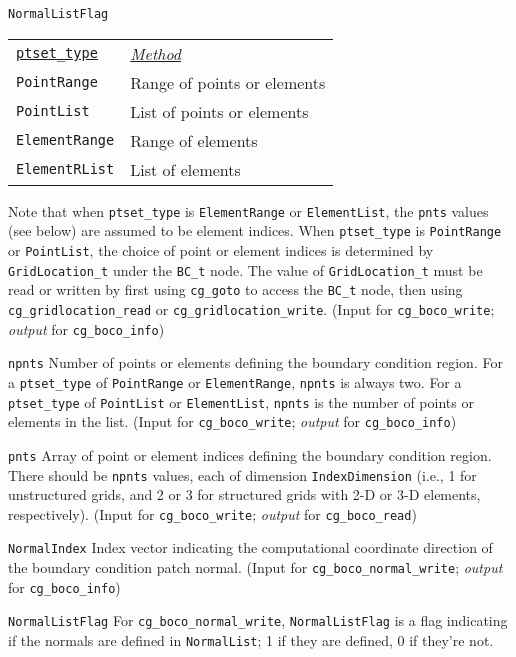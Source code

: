\begin{Ventryi}{\texttt{NormalListFlag}}
      \setlength{\tmplength}{\extrarowheight}	%
      \setlength{\extrarowheight}{0pt}
      \begin{tabular}{@{}l >{\ttfamily}l}
         \uline{\texttt{ptset\_type}} & \uline{\textit{Method}} \\
         \texttt{PointRange}   & Range of points or elements \\
         \texttt{PointList}    & List of points or elements \\
         \texttt{ElementRange} & Range of elements \\
         \texttt{ElementRList} & List of elements
      \end{tabular}
      \setlength{\extrarowheight}{\tmplength}

      Note that when \texttt{ptset\_type} is \texttt{ElementRange} or
      \texttt{ElementList}, the \texttt{pnts} values (see below) are assumed
      to be element indices.
      When \texttt{ptset\_type} is \texttt{PointRange} or \texttt{PointList},
      the choice of point or element indices is determined by
      \texttt{GridLocation\_t} under the \texttt{BC\_t} node.
      The value of \texttt{GridLocation\_t} must be read or
      written by first using \texttt{cg\_goto} to access the
      \texttt{BC\_t} node, then using \texttt{cg\_gridlocation\_read} or
      \texttt{cg\_gridlocation\_write}.
      (\textcolor{input}{Input} for \texttt{cg\_boco\_write};
      \textcolor{output}{\textit{output}} for \texttt{cg\_boco\_info})
\item [\texttt{npnts}]
      Number of points or elements defining the boundary
      condition region.
      For a \texttt{ptset\_type} of \texttt{PointRange} or \texttt{ElementRange},
      \texttt{npnts} is always two.
      For a \texttt{ptset\_type} of \texttt{PointList} or \texttt{ElementList},
      \texttt{npnts} is the number of points or elements in the list.
      (\textcolor{input}{Input} for \texttt{cg\_boco\_write};
      \textcolor{output}{\textit{output}} for \texttt{cg\_boco\_info})
\item [\texttt{pnts}]
      Array of point or element indices defining the boundary condition
      region.
      There should be \texttt{npnts} values, each of dimension
      \texttt{IndexDimension} (i.e., 1 for unstructured grids,
      and 2 or 3 for structured grids with 2-D or 3-D elements,
      respectively).
      (\textcolor{input}{Input} for \texttt{cg\_boco\_write};
      \textcolor{output}{\textit{output}} for \texttt{cg\_boco\_read})
\item [\texttt{NormalIndex}]
      Index vector indicating the computational coordinate direction
      of the boundary condition patch normal.
      (\textcolor{input}{Input} for \texttt{cg\_boco\_normal\_write};
      \textcolor{output}{\textit{output}} for \texttt{cg\_boco\_info})
\item [\texttt{NormalListFlag}]
      For \texttt{cg\_boco\_normal\_write}, \texttt{NormalListFlag} is a
      flag indicating if the normals are defined in \texttt{NormalList};
      1 if they are defined, 0 if they're not.


\end{Ventryi}
